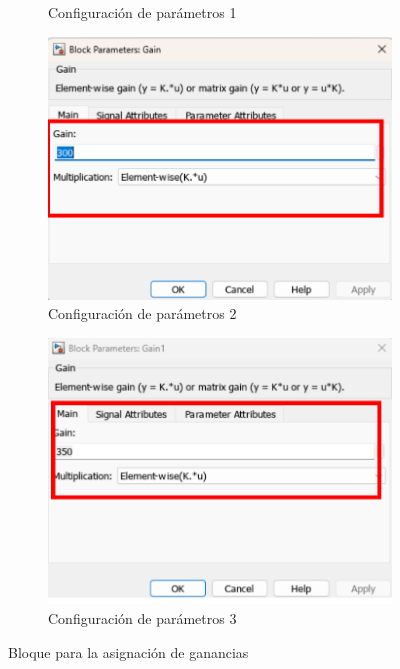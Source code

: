 \begin{figure}[htbp]
\begin{subfigure}[b]{0.45\textwidth}
        \caption{Configuración de parámetros 1}
        \label{fig:parametros_gain_01}
    \end{subfigure}
    \hfill
    \begin{subfigure}[b]{0.45\textwidth}
        \centering
        \includegraphics[width=\textwidth]{fig/Capitulo5/Caso_de_estudio_PID/config_gain_300.pdf}
        \caption{Configuración de parámetros 2}
        \label{fig:parametros_gain_02}
    \end{subfigure}
    \hfill
    \begin{subfigure}[b]{0.45\textwidth}
        \centering
        \includegraphics[width=\textwidth]{fig/Capitulo5/Caso_de_estudio_PID/config_gain_350.pdf}
        \caption{Configuración de parámetros 3}
        \label{fig:parametros_gain_03}
    \end{subfigure}

    \caption{Bloque para la asignación de ganancias}
    \label{fig:arreglo_gain}
\end{figure}


